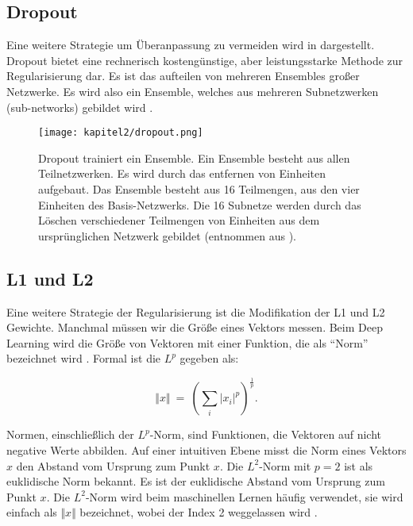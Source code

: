     \subsection{Dropout}
    Eine weitere Strategie um Überanpassung zu vermeiden wird in \cite*{Srivastava2014} dargestellt. Dropout bietet eine rechnerisch kostengünstige, aber leistungsstarke Methode zur Regularisierung dar. Es ist das aufteilen von mehreren Ensembles großer Netzwerke. Es wird also ein Ensemble, welches aus mehreren Subnetzwerken (sub-networks) gebildet wird \cite*[258]{IanGoodfellowYoshuaBengio2016}.



    \begin{figure}[H]
      \centering
      \texttt{[image: kapitel2/dropout.png]}
      \caption[Basis-Netzwerks und Ensemble im Vergleich]{Dropout trainiert ein Ensemble. Ein Ensemble besteht aus allen Teilnetzwerken. Es wird durch das entfernen von Einheiten aufgebaut. Das Ensemble besteht aus 16 Teilmengen, aus den vier Einheiten des Basis-Netzwerks. Die 16 Subnetze werden durch das Löschen verschiedener Teilmengen von Einheiten aus dem ursprünglichen Netzwerk gebildet (entnommen aus \cite*[260]{IanGoodfellowYoshuaBengio2016}).}
      \label{Kap2:Dropout}
    \end{figure}

    \subsection{L1 und L2}
    Eine weitere Strategie der Regularisierung ist die Modifikation der L1 und L2 Gewichte. Manchmal müssen wir die Größe eines Vektors messen. Beim Deep Learning wird die Größe von Vektoren mit einer Funktion, die als \enquote{Norm} bezeichnet wird \cite*[39]{IanGoodfellowYoshuaBengio2016}. Formal ist die $L^p$ gegeben als:

    \begin{equation} \label{FormelNorm2}
      \Vert x\Vert \ =\ \left(\sum _{i}\bigr| x_{i}\bigr|^{p}\right)^{\frac{1}{p}}.
    \end{equation}

    Normen, einschließlich der $L^p$-Norm, sind Funktionen, die Vektoren auf nicht negative Werte abbilden. Auf einer intuitiven Ebene misst die Norm eines Vektors $x$ den Abstand vom Ursprung zum Punkt $x$. Die $L^2$-Norm mit $p = 2$ ist als euklidische Norm bekannt. Es ist der euklidische Abstand vom Ursprung zum Punkt $x$. Die $L^2$-Norm wird beim maschinellen Lernen häufig verwendet, sie wird einfach als $\Vert x\Vert$ bezeichnet, wobei der Index 2 weggelassen wird \cite*[39]{IanGoodfellowYoshuaBengio2016}.

